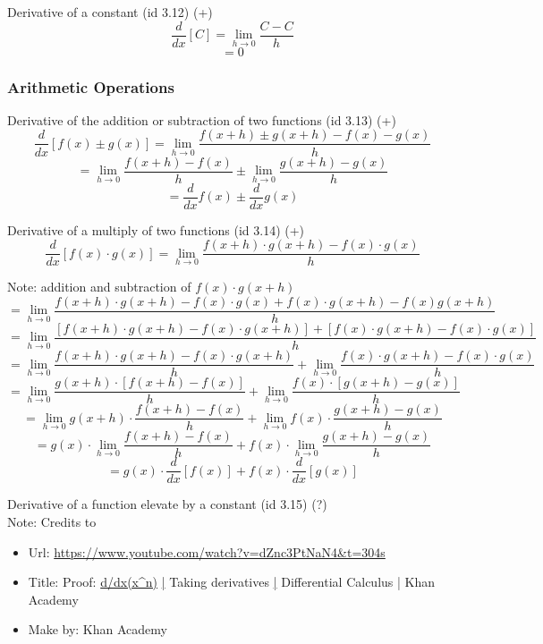 \documentclass{book}
\begin{document}
                    Derivative of a constant (id 3.12) (+)
                    \[\frac{d}{dx} [C] = \lim_{h \rightarrow 0} \frac{C - C}{h}\]
                    \[= 0\]

                \subsubsection{Arithmetic Operations}
                    Derivative of the addition or subtraction of two functions (id 3.13) (+)
                    \[\frac{d}{dx} [f(x) \pm g(x)] = \lim_{h \rightarrow 0} \frac{f(x + h) \pm g(x + h) - f(x) -g(x)}{h}\]
                    \[= \lim_{h \rightarrow 0} \frac{f(x + h) - f(x)}{h} \pm \lim_{h \rightarrow 0} \frac{g(x + h) - g(x)}{h}\]
                    \[= \frac{d}{dx} f(x) \pm \frac{d}{dx} g(x)\]
    
                    Derivative of a multiply of two functions (id 3.14) (+)
                    \[\frac{d}{dx} [f(x) \cdot g(x)] = \lim_{h \rightarrow 0} \frac{f(x + h) \cdot g(x + h) - f(x) \cdot g(x)}{h}\]

                    Note: addition and subtraction of $f(x) \cdot g(x + h)$
                    \[= \lim_{h \rightarrow 0} \frac{f(x + h) \cdot g(x + h) - f(x) \cdot g(x) + f(x) \cdot g(x + h) - f(x) g(x + h)}{h}\]
                    \[= \lim_{h \rightarrow 0} \frac{[f(x + h) \cdot g(x + h) - f(x) \cdot g(x + h)] + [f(x) \cdot g(x + h) - f(x) \cdot g(x)]}{h}\]
                    \[= \lim_{h \rightarrow 0} \frac{f(x + h) \cdot g(x + h) - f(x) \cdot g(x + h)}{h} + \lim_{h \rightarrow 0} \frac{f(x) \cdot g(x + h) - f(x) \cdot g(x)}{h}\]
                    \[= \lim_{h \rightarrow 0} \frac{g(x + h) \cdot [f(x + h) - f(x)]}{h} + \lim_{h \rightarrow 0} \frac{f(x) \cdot [g(x + h) - g(x)]}{h}\]
                    \[= \lim_{h \rightarrow 0} g(x + h) \cdot \frac{f(x + h) - f(x)}{h} + \lim_{h \rightarrow 0} f(x) \cdot \frac{g(x + h) - g(x)}{h}\]
                    \[= g(x) \cdot \lim_{h \rightarrow 0} \frac{f(x + h) - f(x)}{h} + f(x) \cdot \lim_{h \rightarrow 0} \frac{g(x + h) - g(x)}{h}\]
                    \[= g(x) \cdot \frac{d}{dx} [f(x)] + f(x) \cdot \frac{d}{dx} [g(x)]\]                    

                    Derivative of a function elevate by a constant (id 3.15) (?) \\

                    Note: Credits to
                    \begin{itemize}
                        \item Url: \url{https://www.youtube.com/watch?v=dZnc3PtNaN4&t=304s}
                        \item Title: Proof: \url{d/dx(x^n)} \url{|} Taking derivatives \url{|} Differential Calculus \url{|} Khan Academy
                        \item Make by: Khan Academy
                    \end{itemize}
                    
\end{document}
